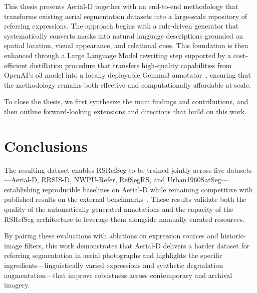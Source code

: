 \cleardoublepage
\label{chap:conclusion}

This thesis presents Aerial\mbox{-}D together with an end-to-end methodology that transforms existing aerial segmentation datasets into a large-scale repository of referring expressions. The approach begins with a rule-driven generator that systematically converts masks into natural language descriptions grounded on spatial location, visual appearance, and relational cues. This foundation is then enhanced through a Large Language Model rewriting step supported by a cost-efficient distillation procedure that transfers high-quality capabilities from OpenAI's o3 model into a locally deployable Gemma3 annotator~\cite{gemma3,o3}, ensuring that the methodology remains both effective and computationally affordable at scale.

To close the thesis, we first synthesize the main findings and contributions, and then outline forward-looking extensions and directions that build on this work.

\section{Conclusions}

The resulting dataset enables RSRefSeg to be trained jointly across five datasets—Aerial-D, RRSIS-D, NWPU-Refer, RefSegRS, and Urban1960SatSeg—establishing reproducible baselines on Aerial\mbox{-}D while remaining competitive with published results on the external benchmarks~\cite{yuan2023rrsis,liu2024rotated,yang2024large,hao2025urban1960satseg}. These results validate both the quality of the automatically generated annotations and the capacity of the RSRefSeg architecture to leverage them alongside manually curated resources.

By pairing these evaluations with ablations on expression sources and historic-image filters, this work demonstrates that Aerial\mbox{-}D delivers a harder dataset for referring segmentation in aerial photographs and highlights the specific ingredients—linguistically varied expressions and synthetic degradation augmentation—that improve robustness across contemporary and archival imagery.

